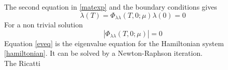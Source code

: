 \documentclass[a4paper]{article}
\begin{document}
The second equation in \eqref{matexp} and the boundary conditions gives
\begin{equation}
    \lambda(T)= \Phi_{\lambda\lambda}(T,0;\mu)\lambda(0)=0
    \label{eq2matexp}
\end{equation}
For a non trivial solution
\begin{equation}
    |\Phi_{\lambda\lambda}(T,0;\mu)|=0
    \label{eveq}
\end{equation}
Equation \eqref{eveq} is the eigenvalue equation for the Hamiltonian system \eqref{hamiltonian}. It can be solved by a Newton-Raphson iteration.\\
The Ricatti 
\end{document}
